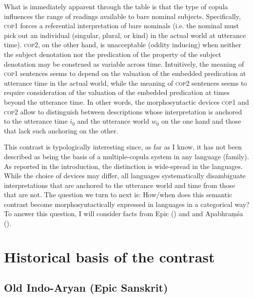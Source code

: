 \documentclass[output=paper,hidelinks]{langscibook}
\begin{document}
\begin{exe}
\begin{xlist}
\begin{xlist}
\begin{exe}
\begin{exe}
\begin{exe}
What is immediately apparent through the table is that the type of copula influences the range of readings available to bare nominal subjects. Specifically, \textsc{cop1} forces a referential interpretation of bare nominals (i.e. the nominal must pick out an individual (singular, plural, or kind) in the actual world at utterance time). \textsc{cop2}, on the other hand, is unacceptable (oddity inducing) when neither the subject denotation nor the predication of the property of the subject denotation may be construed as variable across time. Intuitively, the meaning of \textsc{cop1} sentences seems to depend on the valuation of the embedded predication at utterance time in the actual world, while the meaning of \textsc{cop2} sentences seems to require consideration of the valuation of the embedded predication at times beyond the utterance time. In other words, the morphosyntactic devices \textsc{cop1} and \textsc{cop2} allow  to distinguish between descriptions whose interpretation is anchored to the utterance time $i_0$ and the utterance world $w_0$ on the one hand and those that lack such anchoring on the other.

\begin{sloppypar}
This contrast is typologically interesting since, as far as I know, it has not been described as being the basis of a multiple-copula system in any language (family). As reported in the introduction, the distinction is wide-spread in the  languages. While the choice of devices may differ, all languages systematically disambiguate interpretations that are anchored to the utterance world and time from those that are not. The question we turn to next is: How/when does this semantic contrast become morphosyntactically expressed in  languages in a categorical way? To answer this question, I will consider facts from Epic  () and  and Apabhra\d{m}\'{s}a (). 
\end{sloppypar}

\section{Historical basis of the contrast} \label{historical}\largerpage

\subsection{Old Indo-Aryan (Epic Sanskrit)}


\end{exe}
\end{exe}
\end{exe}
\end{xlist}
\end{xlist}
\end{exe}
\end{document}
